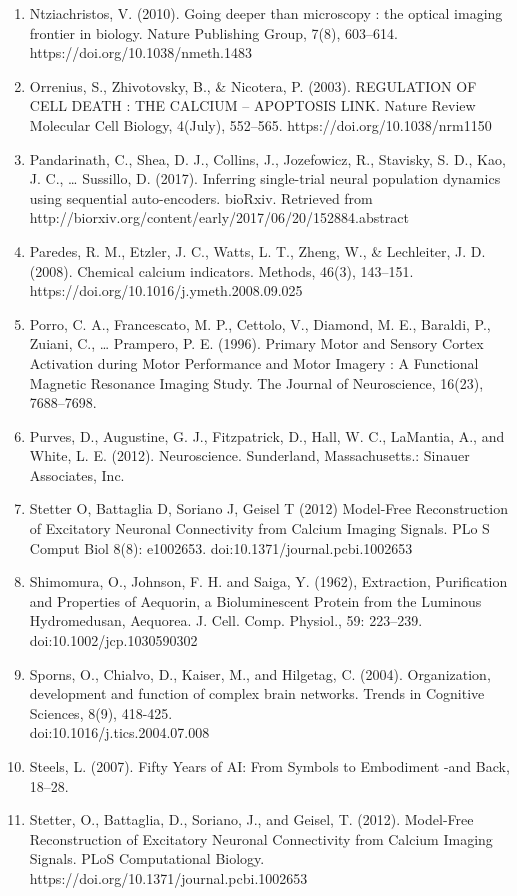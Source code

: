 \documentclass[11pt]{article}
\begin{document}
\begin{enumerate}
\item Ntziachristos, V. (2010). Going deeper than microscopy : the optical imaging frontier in biology. Nature Publishing Group, 7(8), 603–614. https://doi.org/10.1038/nmeth.1483
\item Orrenius, S., Zhivotovsky, B., & Nicotera, P. (2003). REGULATION OF CELL DEATH : THE CALCIUM – APOPTOSIS LINK. Nature Review Molecular Cell Biology, 4(July), 552–565. https://doi.org/10.1038/nrm1150
\item Pandarinath, C., Shea, D. J., Collins, J., Jozefowicz, R., Stavisky, S. D., Kao, J. C., … Sussillo, D. (2017). Inferring single-trial neural population dynamics using sequential auto-encoders. bioRxiv. Retrieved from http://biorxiv.org/content/early/2017/06/20/152884.abstract
\item Paredes, R. M., Etzler, J. C., Watts, L. T., Zheng, W., & Lechleiter, J. D. (2008). Chemical calcium indicators. Methods, 46(3), 143–151. https://doi.org/10.1016/j.ymeth.2008.09.025
\item Porro, C. A., Francescato, M. P., Cettolo, V., Diamond, M. E., Baraldi, P., Zuiani, C., … Prampero, P. E. (1996). Primary Motor and Sensory Cortex Activation during Motor Performance and Motor Imagery : A Functional Magnetic Resonance Imaging Study. The Journal of Neuroscience, 16(23), 7688–7698.
\item Purves, D., Augustine, G. J., Fitzpatrick, D., Hall, W. C., LaMantia, A., and White, L. E. (2012). Neuroscience. Sunderland, Massachusetts.: Sinauer Associates, Inc.
\item Stetter  O,  Battaglia  D,  Soriano  J,  Geisel  T  (2012)  Model-Free  Reconstruction  of  Excitatory  Neuronal  Connectivity  from  Calcium  Imaging  Signals.  PLo S Comput  Biol  8(8):  e1002653.  doi:10.1371/journal.pcbi.1002653
\item Shimomura, O., Johnson, F. H. and Saiga, Y. (1962), Extraction, Purification and Properties of Aequorin, a Bioluminescent Protein from the Luminous Hydromedusan, Aequorea. J. Cell. Comp. Physiol., 59: 223–239. doi:10.1002/jcp.1030590302
\item Sporns, O., Chialvo, D., Kaiser, M., and Hilgetag, C. (2004). Organization, development and function of complex brain networks. Trends in Cognitive Sciences, 8(9), 418-425. \\doi:10.1016/j.tics.2004.07.008
\item Steels, L. (2007). Fifty Years of AI: From Symbols to Embodiment -and Back, 18–28.
\item Stetter, O., Battaglia, D., Soriano, J., and Geisel, T. (2012). Model-Free Reconstruction of Excitatory Neuronal Connectivity from Calcium Imaging Signals. PLoS Computational Biology. https://doi.org/10.1371/journal.pcbi.1002653

\end{enumerate}
\end{document}
